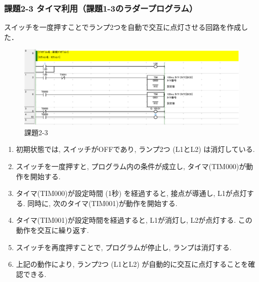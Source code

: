 \subsubsection*{課題2-3 タイマ利用（課題1-3のラダープログラム）}
スイッチを一度押すことでランプ2つを自動で交互に点灯させる回路を作成した．
\begin{figure}[H]
  \centering
  \includegraphics[scale=1]{sozai/2-3-crop.pdf}
  \caption{課題2-3}
\end{figure}
\begin{enumerate}
  \item 初期状態では, スイッチがOFFであり, ランプ2つ (L1とL2) は消灯している.
  \item スイッチを一度押すと, プログラム内の条件が成立し, タイマ(TIM000)が動作を開始する.
  \item タイマ(TIM000)が設定時間 (1秒) を経過すると, 接点が導通し, L1が点灯する. 同時に, 次のタイマ(TIM001)が動作を開始する.
  \item タイマ(TIM001)が設定時間を経過すると, L1が消灯し, L2が点灯する. この動作を交互に繰り返す.
  \item スイッチを再度押すことで, プログラムが停止し, ランプは消灯する.
  \item 上記の動作により, ランプ2つ (L1とL2) が自動的に交互に点灯することを確認できる.
\end{enumerate}


